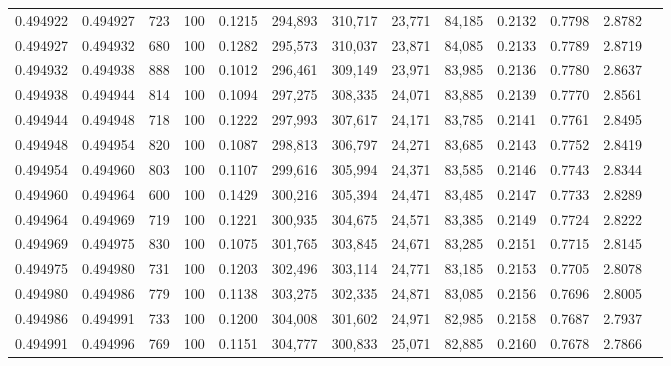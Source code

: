\begin{tabular}{rrrrrrrrrrrrr}
0.494922 & 0.494927 &   723 & 100 &                                     0.1215 & 294,893 & 310,717 &  23,771 &  84,185 & 0.2132 & 0.7798 & 2.8782 \\
0.494927 & 0.494932 &   680 & 100 &                                     0.1282 & 295,573 & 310,037 &  23,871 &  84,085 & 0.2133 & 0.7789 & 2.8719 \\
0.494932 & 0.494938 &   888 & 100 &                                     0.1012 & 296,461 & 309,149 &  23,971 &  83,985 & 0.2136 & 0.7780 & 2.8637 \\
0.494938 & 0.494944 &   814 & 100 &                                     0.1094 & 297,275 & 308,335 &  24,071 &  83,885 & 0.2139 & 0.7770 & 2.8561 \\
0.494944 & 0.494948 &   718 & 100 &                                     0.1222 & 297,993 & 307,617 &  24,171 &  83,785 & 0.2141 & 0.7761 & 2.8495 \\
0.494948 & 0.494954 &   820 & 100 &                                     0.1087 & 298,813 & 306,797 &  24,271 &  83,685 & 0.2143 & 0.7752 & 2.8419 \\
0.494954 & 0.494960 &   803 & 100 &                                     0.1107 & 299,616 & 305,994 &  24,371 &  83,585 & 0.2146 & 0.7743 & 2.8344 \\
0.494960 & 0.494964 &   600 & 100 &                                     0.1429 & 300,216 & 305,394 &  24,471 &  83,485 & 0.2147 & 0.7733 & 2.8289 \\
0.494964 & 0.494969 &   719 & 100 &                                     0.1221 & 300,935 & 304,675 &  24,571 &  83,385 & 0.2149 & 0.7724 & 2.8222 \\
0.494969 & 0.494975 &   830 & 100 &                                     0.1075 & 301,765 & 303,845 &  24,671 &  83,285 & 0.2151 & 0.7715 & 2.8145 \\
0.494975 & 0.494980 &   731 & 100 &                                     0.1203 & 302,496 & 303,114 &  24,771 &  83,185 & 0.2153 & 0.7705 & 2.8078 \\
0.494980 & 0.494986 &   779 & 100 &                                     0.1138 & 303,275 & 302,335 &  24,871 &  83,085 & 0.2156 & 0.7696 & 2.8005 \\
0.494986 & 0.494991 &   733 & 100 &                                     0.1200 & 304,008 & 301,602 &  24,971 &  82,985 & 0.2158 & 0.7687 & 2.7937 \\
0.494991 & 0.494996 &   769 & 100 &                                     0.1151 & 304,777 & 300,833 &  25,071 &  82,885 & 0.2160 & 0.7678 & 2.7866 \\

\end{tabular}
